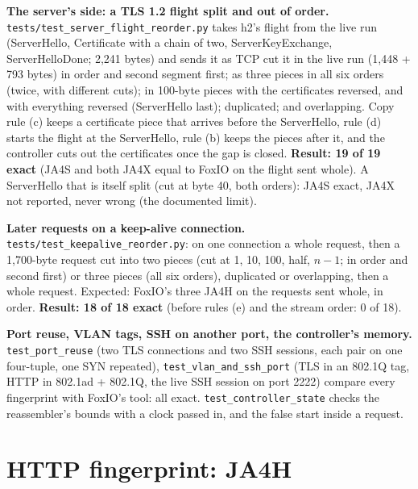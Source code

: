 \documentclass[11pt,a4paper]{article}
\newcommand{\code}[1]{\texttt{#1}}
\begin{document}
\textbf{The server's side: a TLS 1.2 flight split and out of order.} \code{tests/test\_server\_flight\_reorder.py}
takes h2's flight from the live run (ServerHello, Certificate with a chain of two, ServerKeyExchange,
ServerHelloDone; 2,241 bytes) and sends it as TCP cut it in the live run (1,448 + 793 bytes) in order and second
segment first; as three pieces in all six orders (twice, with different cuts); in 100-byte pieces with the
certificates reversed, and with everything reversed (ServerHello last); duplicated; and overlapping. Copy rule (c)
keeps a certificate piece that arrives before the ServerHello, rule (d) starts the flight at the ServerHello, rule
(b) keeps the pieces after it, and the controller cuts out the certificates once the gap is closed.
\textbf{Result: 19 of 19 exact} (JA4S and both JA4X equal to FoxIO on the flight sent whole). A ServerHello that is
itself split (cut at byte 40, both orders): JA4S exact, JA4X not reported, never wrong (the documented limit).

\textbf{Later requests on a keep-alive connection.} \code{tests/test\_keepalive\_reorder.py}: on one connection a
whole request, then a 1,700-byte request cut into two pieces (cut at 1, 10, 100, half, $n-1$; in order and second
first) or three pieces (all six orders), duplicated or overlapping, then a whole request. Expected: FoxIO's three
JA4H on the requests sent whole, in order. \textbf{Result: 18 of 18 exact} (before rules (e) and the stream order:
0 of 18).

\textbf{Port reuse, VLAN tags, SSH on another port, the controller's memory.} \code{test\_port\_reuse} (two TLS
connections and two SSH sessions, each pair on one four-tuple, one SYN repeated), \code{test\_vlan\_and\_ssh\_port}
(TLS in an 802.1Q tag, HTTP in 802.1ad + 802.1Q, the live SSH session on port 2222) compare every fingerprint with
FoxIO's tool: all exact. \code{test\_controller\_state} checks the reassembler's bounds with a clock passed in, and
the false start inside a request.

\section{HTTP fingerprint: JA4H}
\label{sec:http}
\end{document}
